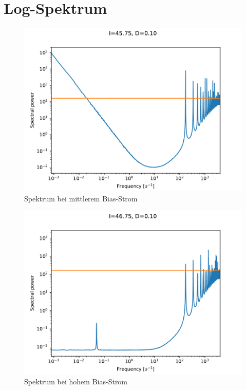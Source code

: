 \documentclass[12pt,a4paper]{article}
\begin{document}
\section{Log-Spektrum}
\begin{figure}[H]
	\centering
	\includegraphics[scale=1]{logspecmed.pdf}\caption{Spektrum bei mittlerem Bias-Strom}
	\label{specmedlog}
\end{figure}
\begin{figure}[H]
	\centering
	\includegraphics[scale=1]{logspeclarge.pdf}\caption{Spektrum bei hohem Bias-Strom}
	\label{speclargelog}
\end{figure}
\end{document}
